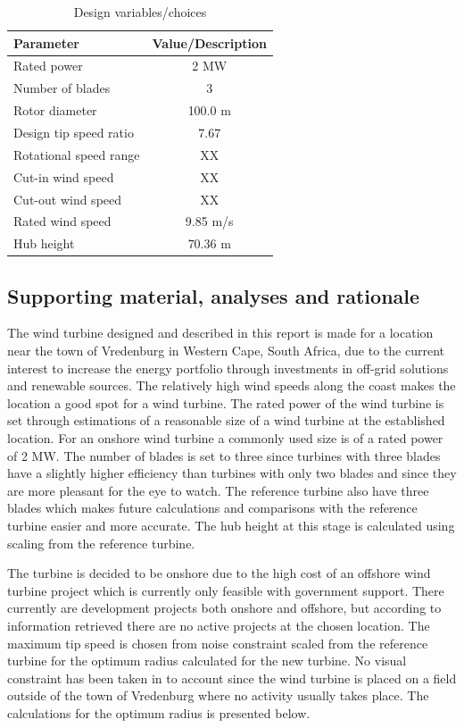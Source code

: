 \begin{table}[H]
\begin{center} 
\caption{Design variables/choices}\label{tab:systdesign2}
\begin{tabular}{ |l|c| } 
\hline
\textbf{Parameter} & \textbf{Value/Description}  \\ 
\hline
Rated power & 2 MW  \\ 
\hline
Number of blades & 3 \\ 
\hline
Rotor diameter & 100.0 m \\
\hline
Design tip speed ratio & 7.67 \\
\hline
Rotational speed range & XX \\
\hline
Cut-in wind speed & XX \\
\hline
Cut-out wind speed & XX \\
\hline
Rated wind speed & 9.85 m/s\\
\hline
Hub height & 70.36 m\\
\hline
\end{tabular}
\end{center}
\end{table}

\subsection{Supporting material, analyses and rationale}

The wind turbine designed and described in this report is made for a location near the town of Vredenburg in Western Cape, South Africa, due to the current interest to increase the energy portfolio through investments in off-grid solutions and renewable sources. The relatively high wind speeds along the coast makes the location a good spot for a wind turbine. The rated power of the wind turbine is set through estimations of a reasonable size of a wind turbine at the established location. For an onshore wind turbine a commonly used size is of a rated power of 2 MW. The number of blades is set to three since turbines with three blades have a slightly higher efficiency than turbines with only two blades and since they are more pleasant for the eye to watch. The reference turbine also have three blades which makes future calculations and comparisons with the reference turbine easier and more accurate. The hub height at this stage is calculated using scaling from the reference turbine.

The turbine is decided to be onshore due to the high cost of an offshore wind turbine project which is currently only feasible with government support. There currently are development projects both onshore and offshore, but according to information retrieved there are no active projects at the chosen location. The maximum tip speed is chosen from noise constraint scaled from the reference turbine for the optimum radius calculated for the new turbine. No visual constraint has been taken in to account since the wind turbine is placed on a field outside of the town of Vredenburg where no activity usually takes place. The calculations for the optimum radius is presented below.

